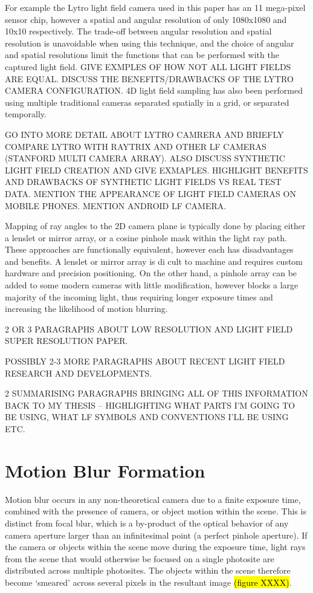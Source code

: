 For example the Lytro light field camera used in this paper has an 11 mega-pixel sensor chip, however a spatial and angular resolution of only 1080x1080 and 10x10 respectively. The trade-off between angular resolution and spatial resolution is unavoidable when using this technique, and the choice of angular and spatial resolutions limit the functions that can be performed with the captured light field.
GIVE EXMPLES OF HOW NOT ALL LIGHT FIELDS ARE EQUAL.
DISCUSS THE BENEFITS/DRAWBACKS OF THE LYTRO CAMERA CONFIGURATION.
4D light field sampling has also been performed using multiple traditional cameras separated spatially in a grid, or separated temporally.

GO INTO MORE DETAIL ABOUT LYTRO CAMRERA AND BRIEFLY COMPARE LYTRO WITH RAYTRIX AND OTHER LF CAMERAS (STANFORD MULTI CAMERA ARRAY).
ALSO DISCUSS SYNTHETIC LIGHT FIELD CREATION AND GIVE EXMAPLES.
HIGHLIGHT BENEFITS AND DRAWBACKS OF SYNTHETIC LIGHT FIELDS VS REAL TEST DATA.
MENTION THE APPEARANCE OF LIGHT FIELD CAMERAS ON MOBILE PHONES.
MENTION ANDROID LF CAMERA.

Mapping of ray angles to the 2D camera plane is typically done by placing either a lenslet or mirror array, or a cosine pinhole mask within the light ray path. These approaches are functionally equivalent, however each has disadvantages and benefits. A lenslet or mirror array is di cult to machine and requires custom hardware and precision positioning. On the other hand, a pinhole array can be added to some modern cameras with little modification, however blocks a large majority of the incoming light, thus requiring longer exposure times and increasing the likelihood of motion blurring.

2 OR 3 PARAGRAPHS ABOUT LOW RESOLUTION AND LIGHT FIELD SUPER RESOLUTION PAPER.

POSSIBLY 2-3 MORE PARAGRAPHS ABOUT RECENT LIGHT FIELD RESEARCH AND DEVELOPMENTS.

2 SUMMARISING PARAGRAPHS BRINGING ALL OF THIS INFORMATION BACK TO MY THESIS – HIGHLIGHTING WHAT PARTS I’M GOING TO BE USING, WHAT LF SYMBOLS AND CONVENTIONS I’LL BE USING ETC.


\section{Motion Blur Formation}
\label{sec:motion_blur_formation}

Motion blur occurs in any non-theoretical camera due to a finite exposure time, combined with the presence of camera, or object motion within the scene.
This is distinct from focal blur, which is a by-product of the optical behavior of any camera aperture larger than an infinitesimal point (a perfect pinhole aperture).
If the camera or objects within the scene move during the exposure time, light rays from the scene that would otherwise be focused on a single photosite are distributed across multiple photosites.
The objects within the scene therefore become \enquote*{smeared} across several pixels in the resultant image \hl{(figure XXXX)}.


